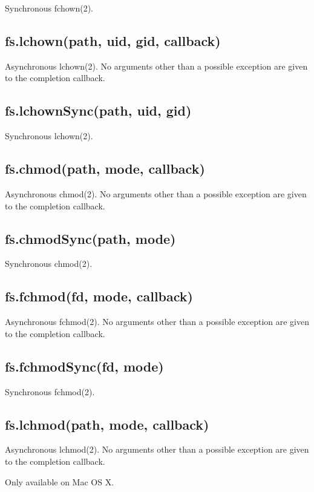 Synchronous fchown(2).

\subsection{fs.lchown(path, uid, gid, callback)}

Asynchronous lchown(2). No arguments other than a possible exception are
given to the completion callback.

\subsection{fs.lchownSync(path, uid, gid)}

Synchronous lchown(2).

\subsection{fs.chmod(path, mode, callback)}

Asynchronous chmod(2). No arguments other than a possible exception are
given to the completion callback.

\subsection{fs.chmodSync(path, mode)}

Synchronous chmod(2).

\subsection{fs.fchmod(fd, mode, callback)}

Asynchronous fchmod(2). No arguments other than a possible exception are
given to the completion callback.

\subsection{fs.fchmodSync(fd, mode)}

Synchronous fchmod(2).

\subsection{fs.lchmod(path, mode, callback)}

Asynchronous lchmod(2). No arguments other than a possible exception are
given to the completion callback.

Only available on Mac OS X.


